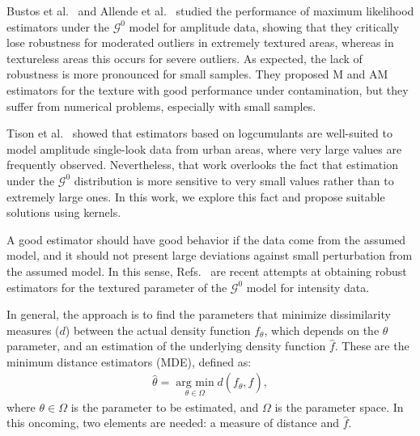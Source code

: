 \documentclass[twocolumn]{svjour3}
\newcommand{\argmin}{\operatorname*{\text{arg min }}}
\begin{document}
	Bustos et al.~\cite{BustosFreryLucini:Mestimators:2001} and
	Allende et al.~\cite{AllendeFreryetal:JSCS:05} studied the performance of maximum likelihood estimators under the $\mathcal{G}^{0}$ model for amplitude data, showing that they critically lose robustness for moderated outliers in extremely textured areas, whereas in textureless areas this occurs for severe outliers.
	As expected, the lack of robustness is more pronounced for small samples. 
	They proposed M and AM estimators for the texture with good performance under contamination, but they suffer from numerical problems, especially with small samples.
	
	Tison et al.~\cite{Tison2004} showed that estimators based on logcumulants 
	are well-suited to model amplitude single-look data from urban areas, where very large values are frequently observed.
	Nevertheless, that work overlooks the fact that estimation under the $\mathcal G^0$ distribution is more sensitive to very small values rather than to extremely large ones.
	In this work, we explore this fact and propose suitable solutions using kernels.
	
	A good estimator should have good behavior if the data come from the assumed model, and it should not present large deviations against small perturbation from the assumed model.
	In this sense, Refs.~\cite{APSAR2013ParameterEstimationStochasticDistances,gambini2015} are recent attempts at obtaining robust estimators for the textured parameter of the $\mathcal{G}^0$ model for intensity data.
	
	In general, the approach is to find the parameters that minimize dissimilarity measures ($d$) between the actual density function $f_{\theta}$, which depends on the $\theta$ parameter, and an estimation of the underlying density function $\widehat{f}$. 
	These are the minimum distance estimators (MDE), defined as:
	\begin{align}
		\label{MDEGeneral}
		\widehat{\theta}=
		\argmin_{\theta\in\Omega}
		d(f_{\theta}, \widehat{f}),
	\end{align}
	where $\theta\in\Omega$ is the parameter to be estimated,
	and $\Omega$ is the parameter space. 
	In this oncoming, two elements are needed: a measure of distance and $\widehat{f}$.
	
\end{document}
